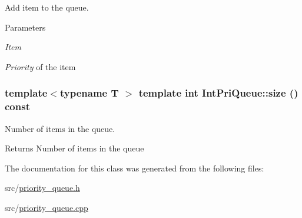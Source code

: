 Add item to the queue. 


\begin{DoxyParams}{Parameters}
\item[{\em Item}]\item[{\em Priority}]of the item \end{DoxyParams}
\hypertarget{class_priority_queue_a78870582a8eeb9ec8fe33e9fe72780de}{
\subsubsection[{size}]{\setlength{\rightskip}{0pt plus 5cm}template$<$typename T $>$ template int IntPriQueue::size () const}}
\label{class_priority_queue_a78870582a8eeb9ec8fe33e9fe72780de}


Number of items in the queue. 

\begin{DoxyReturn}{Returns}
Number of items in the queue 
\end{DoxyReturn}


The documentation for this class was generated from the following files:\begin{DoxyCompactItemize}
\item 
src/\hyperlink{priority__queue_8h}{priority\_\-queue.h}\item 
src/\hyperlink{priority__queue_8cpp}{priority\_\-queue.cpp}\end{DoxyCompactItemize}

